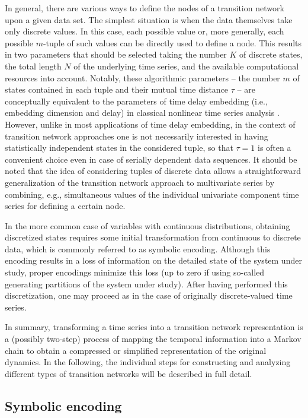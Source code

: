 In general, there are various ways to define the nodes of a transition network upon a given data set. The simplest situation is when the data themselves take only discrete values. In this case, each possible value or, more generally, each possible $m$-tuple of such values can be directly used to define a node. This results in two parameters that should be selected taking the number $K$ of discrete states, the total length $N$ of the underlying time series, and the available computational resources into account. Notably, these algorithmic parameters -- the number $m$ of states contained in each tuple and their mutual time distance $\tau$ -- are conceptually equivalent to the parameters of time delay embedding (i.e., embedding dimension and delay) in classical nonlinear time series analysis \cite{Packard1980,kantz1997}. However, unlike in most applications of time delay embedding, in the context of transition network approaches one is not necessarily interested in having statistically independent states in the considered tuple, so that $\tau=1$ is often a convenient choice even in case of serially dependent data sequences. It should be noted that the idea of considering tuples of discrete data allows a straightforward generalization of the transition network approach to multivariate series by combining, e.g., simultaneous values of the individual univariate component time series for defining a certain node.

In the more common case of variables with continuous distributions, obtaining discretized states requires some initial transformation from continuous to discrete data, which is commonly referred to as symbolic encoding. Although this encoding results in a loss of information on the detailed state of the system under study, proper encodings minimize this loss (up to zero if using so-called generating partitions of the system under study). After having performed this discretization, one may proceed as in the case of originally discrete-valued time series.

In summary, transforming a time series into a transition network representation is a (possibly two-step) process of mapping the temporal information into a Markov chain to obtain a compressed or simplified representation of the original dynamics. In the following, the individual steps for constructing and analyzing different types of transition networks will be described in full detail.

\subsection{Symbolic encoding}\label{sec:symbolic}

